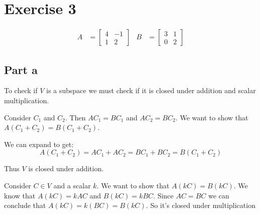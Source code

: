 \section{Exercise 3}
\begin{align*}
	A & = \begin{bmatrix}
		      4 & -1 \\
		      1 & 2
	      \end{bmatrix} &
	B & = \begin{bmatrix}
		      3 & 1 \\
		      0 & 2
	      \end{bmatrix}
\end{align*}

\subsection{Part a}

To check if $V$ is a subspace we must check if it is closed under addition and scalar multiplication.

Consider $C_1$ and $C_2$. Then $AC_1 = BC_1$ and $AC_2 = BC_2$. We want to show that $A(C_1 + C_2) = B(C_1 + C_2)$.

We can expand to get:
\[
	A(C_1 + C_2) = AC_1 + AC_2 = BC_1 + BC_2 = B(C_1 + C_2)
\]

Thus $V$ is closed under addition.

Consider $C\in V$ and a scalar $k$. We want to show that $A(kC) = B(kC)$.
We know that $A(kC) = kAC$ and $B(kC) = kBC$. Since $AC = BC$ we can conclude that $A(kC) = k(BC) = B(kC)$. So it's closed under multiplication
